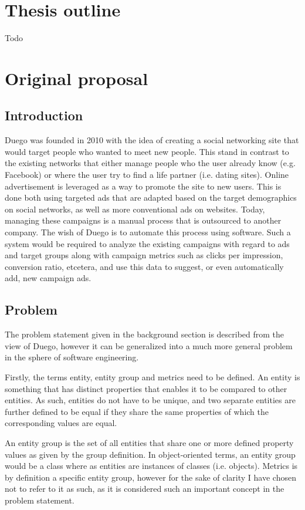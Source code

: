 \documentclass[a4paper]{article}
\begin{document}
\section{Thesis outline}
Todo

\section{Original proposal}

\subsection{Introduction}
Duego was founded in 2010 with the idea of creating a social networking site that would target people who wanted to meet new
people. This stand in contrast to the existing networks that either manage people who the user already know (e.g. Facebook)
or where the user try to find a life partner (i.e. dating sites). Online advertisement is leveraged as a way to promote the
site to new users. This is done both using targeted ads that are adapted based on the target demographics on social networks,
as well as more conventional ads on websites. Today, managing these campaigns is a manual process that is outsourced to
another company. The wish of Duego is to automate this process using software. Such a system would be required to analyze
the existing campaigns with regard to ads and target groups along with campaign metrics such as clicks per impression,
conversion ratio, etcetera, and use this data to suggest, or even automatically add, new campaign ads.

\subsection{Problem}
The problem statement given in the background section is described from the view of Duego, however it can be generalized into
a much more general problem in the sphere of software engineering.

Firstly, the terms entity, entity group and metrics need to be defined. An entity is something that has distinct properties
that enables it to be compared to other entities. As such, entities do not have to be unique, and two separate entities are
further defined to be equal if they share the same properties of which the corresponding values are equal.

An entity group is the set of all entities that share one or more defined property values as given by the group definition.
In object-oriented terms, an entity group would be a class where as entities are instances of classes (i.e. objects). Metrics
is by definition a specific entity group, however for the sake of clarity I have chosen not to refer to it as such, as it is
considered such an important concept in the problem statement.
\end{document}
